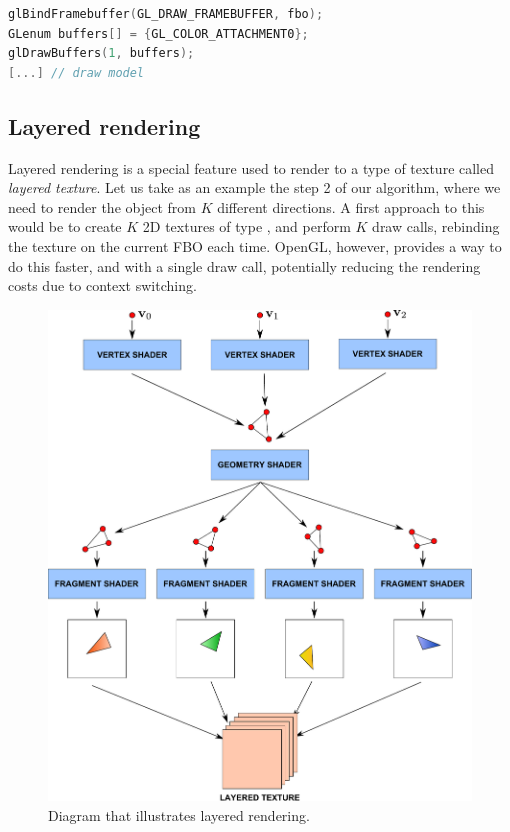 \begin{lstlisting}[language=C++,label=lst:rendertotexturerender,caption={Render to texture example, rendering phase. Since we have not configured and FBO for depth and stencil buffers, depth testing and stencil should be disabled at this point.}]
glBindFramebuffer(GL_DRAW_FRAMEBUFFER, fbo);
GLenum buffers[] = {GL_COLOR_ATTACHMENT0};
glDrawBuffers(1, buffers);
[...] // draw model
\end{lstlisting}

\subsection{Layered rendering}
\label{sec:layeredrendering}
Layered rendering is a special feature used to render to a type of texture called \emph{layered texture}. Let us take as an example the step 2 of our algorithm, where we need to render the object from $K$ different directions. A first approach to this would be to create $K$ 2D textures of type , and perform $K$ draw calls, rebinding the texture on the current FBO each time. OpenGL, however, provides a way to do this faster, and with a single draw call, potentially reducing the rendering costs due to context switching.

\begin{figure}[!ht]
\centering
\includegraphics[width=\linewidth]{images/method/layered.pdf}
\caption{Diagram that illustrates layered rendering.}
\label{fig:layered}
\end{figure} 

